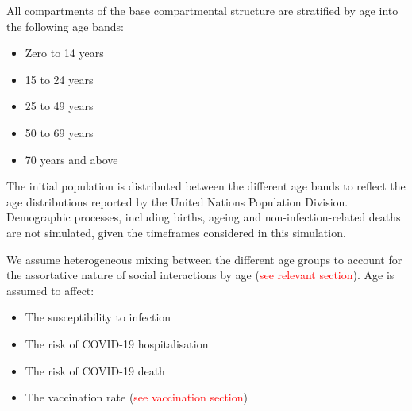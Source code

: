 All compartments of the base compartmental structure are stratified by age into the following age bands:
\begin{itemize}
    \item Zero to 14 years
    \item 15 to 24 years
    \item 25 to 49 years
    \item 50 to 69 years
    \item 70 years and above
\end{itemize}
The initial population is distributed between the different age bands to reflect the age distributions reported by the United Nations Population Division. Demographic processes, including births, ageing and non-infection-related deaths are not simulated, given the timeframes considered in this simulation.

We assume heterogeneous mixing between the different age groups to account for the assortative nature of social interactions by age (\textcolor{red}{see relevant section}).
Age is assumed to affect:
\begin{itemize}
    \item The susceptibility to infection
    \item The risk of COVID-19 hospitalisation
    \item The risk of COVID-19 death
    \item The vaccination rate (\textcolor{red}{see vaccination section})
\end{itemize}